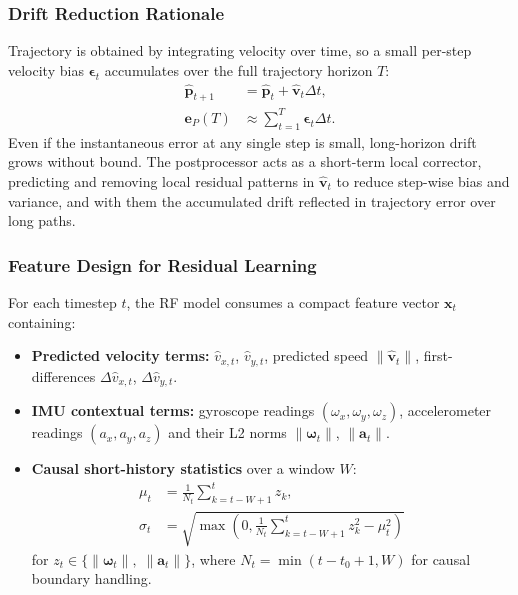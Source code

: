 \documentclass[10pt,conference,letterpaper]{IEEEtran}
\begin{document}
\subsubsection{Drift Reduction Rationale}

Trajectory is obtained by integrating velocity over time, so a small
per-step velocity bias $\boldsymbol{\epsilon}_t$ accumulates over the
full trajectory horizon $T$:
\begin{align}
  \hat{\mathbf{p}}_{t+1} &= \hat{\mathbf{p}}_t + \hat{\mathbf{v}}_t \Delta t, \\
  \mathbf{e}_P(T) &\approx \sum_{t=1}^{T} \boldsymbol{\epsilon}_t \Delta t.
\end{align}
Even if the instantaneous error at any single step is small, long-horizon
drift grows without bound. The postprocessor acts as a short-term local
corrector, predicting and removing local residual patterns in
$\hat{\mathbf{v}}_t$ to reduce step-wise bias and variance, and with
them the accumulated drift reflected in trajectory error over long
paths.

\subsubsection{Feature Design for Residual Learning}

For each timestep $t$, the RF model consumes a compact feature vector
$\mathbf{x}_t$ containing:

\begin{itemize}
  \item \textbf{Predicted velocity terms:} $\hat{v}_{x,t}$,
        $\hat{v}_{y,t}$, predicted speed $\|\hat{\mathbf{v}}_t\|$,
        first-differences $\Delta \hat{v}_{x,t}$,
        $\Delta \hat{v}_{y,t}$.
  \item \textbf{IMU contextual terms:} gyroscope readings
        $(\omega_x, \omega_y, \omega_z)$, accelerometer readings
        $(a_x, a_y, a_z)$ and their L2 norms
        $\|\boldsymbol{\omega}_t\|$, $\|\mathbf{a}_t\|$.
  \item \textbf{Causal short-history statistics} over a window $W$:
        \begin{align}
          \mu_t &= \frac{1}{N_t}\sum_{k=t-W+1}^{t}z_k, \\
          \sigma_t &=
          \sqrt{\max\!\left(0,\frac{1}{N_t}
          \sum_{k=t-W+1}^{t}z_k^2 - \mu_t^2\right)}
        \end{align}
        for $z_t \in \{\|\boldsymbol{\omega}_t\|,\; \|\mathbf{a}_t\|\}$,
        where $N_t = \min(t - t_0 + 1, W)$ for causal boundary handling.
\end{itemize}
\end{document}
